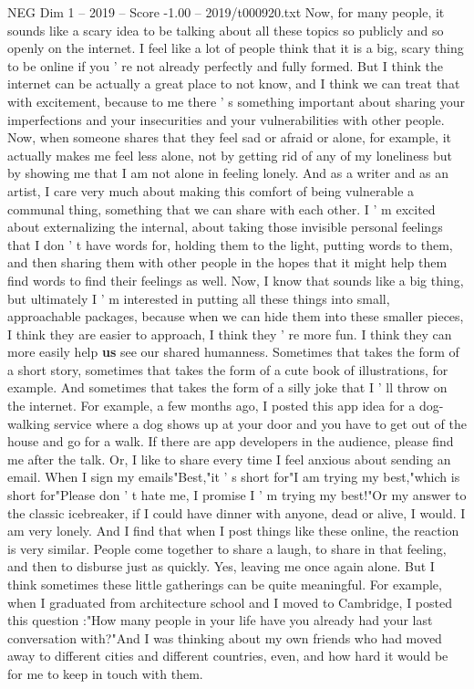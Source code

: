 \begin{textsample}{NEG Dim 1 – 2019 – Score -1.00 – 2019/t000920.txt}
Now, for many people, it sounds like a scary idea to be talking about all these topics so publicly and so openly on the internet.
I feel like a lot of people think that it is a big, scary thing to be online if you ' re not already perfectly and fully formed.
But I think the internet can be actually a great place to not know, and I think we can treat that with excitement, because to me there ' s something important about sharing your imperfections and your insecurities and your vulnerabilities with other people.
Now, when someone shares that they feel sad or afraid or alone, for example, it actually makes me feel less alone, not by getting rid of any of my loneliness but by showing me that I am not alone in feeling lonely.
And as a writer and as an artist, I care very much about making this comfort of being vulnerable a communal thing, something that we can share with each other.
I ' m excited about externalizing the internal, about taking those invisible personal feelings that I don ' t have words for, holding them to the light, putting words to them, and then sharing them with other people in the hopes that it might help them find words to find their feelings as well.
Now, I know that sounds like a big thing, but ultimately I ' m interested in putting all these things into small, approachable packages, because when we can hide them into these smaller pieces, I think they are easier to approach, I think they ' re more fun.
I think they can more easily help \textbf{us} see our shared humanness.
Sometimes that takes the form of a short story, sometimes that takes the form of a cute book of illustrations, for example.
And sometimes that takes the form of a silly joke that I ' ll throw on the internet.
For example, a few months ago, I posted this app idea for a dog-walking service where a dog shows up at your door and you have to get out of the house and go for a walk.
If there are app developers in the audience, please find me after the talk.
Or, I like to share every time I feel anxious about sending an email.
When I sign my emails"Best,"it ' s short for"I am trying my best,"which is short for"Please don ' t hate me, I promise I ' m trying my best!"Or my answer to the classic icebreaker, if I could have dinner with anyone, dead or alive, I would.
I am very lonely.
And I find that when I post things like these online, the reaction is very similar.
People come together to share a laugh, to share in that feeling, and then to disburse just as quickly.
Yes, leaving me once again alone.
But I think sometimes these little gatherings can be quite meaningful.
For example, when I graduated from architecture school and I moved to Cambridge, I posted this question :"How many people in your life have you already had your last conversation with?"And I was thinking about my own friends who had moved away to different cities and different countries, even, and how hard it would be for me to keep in touch with them.

\end{textsample}

